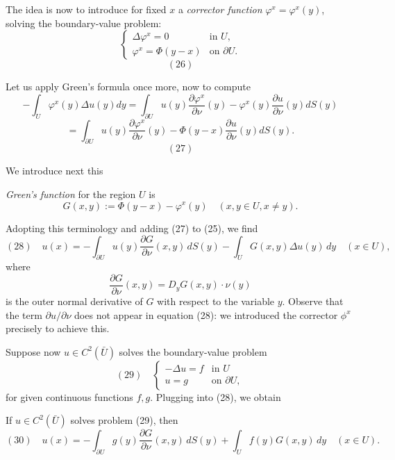 The idea is now to introduce for fixed $x$ a \textit{corrector function} $\varphi^x = \varphi^x(y)$, solving the boundary-value problem:
$$\begin{cases}
\Delta \varphi^x = 0 & \text{in } U, \\
\varphi^x = \Phi(y - x) & \text{on } \partial U.
\end{cases}$$
$$(26)$$

Let us apply Green's formula once more, now to compute
$$- \int_U \varphi^x(y) \Delta u(y) dy = \int_{\partial U} u(y) \frac{\partial \varphi^x}{\partial \nu}(y) - \varphi^x(y) \frac{\partial u}{\partial \nu}(y) dS(y)$$
$$= \int_{\partial U} u(y) \frac{\partial \varphi^x}{\partial \nu}(y) - \Phi(y - x) \frac{\partial u}{\partial \nu}(y) dS(y).$$
$$(27)$$

We introduce next this

\begin{definition}
\label{def:greens-function}
\textit{Green's function} for the region $U$ is
$$G(x, y) := \Phi(y - x) - \varphi^x(y) \quad (x, y \in U, x \neq y).$$
\end{definition}

Adopting this terminology and adding (27) to (25), we find
$$(28) \quad u(x) = -\int_{\partial U} u(y) \frac{\partial G}{\partial \nu}(x, y) \, dS(y) - \int_U G(x,y)\Delta u(y) \, dy \quad (x \in U),$$
where
$$\frac{\partial G}{\partial \nu}(x,y) = D_y G(x,y) \cdot \nu(y)$$
is the outer normal derivative of $G$ with respect to the variable $y$. Observe that the term $\partial u/\partial \nu$ does not appear in equation (28): we introduced the corrector $\phi^x$ precisely to achieve this.

Suppose now $u \in C^2(\bar{U})$ solves the boundary-value problem
$$(29) \quad \begin{cases}
-\Delta u = f & \text{in } U \\
u = g & \text{on } \partial U,
\end{cases}$$
for given continuous functions $f, g$. Plugging into (28), we obtain

\begin{theorem}
\label{thm:representation-formula-greens-function}
If $u \in C^2(\bar{U})$ solves problem (29), then
$$(30) \quad u(x) = -\int_{\partial U} g(y) \frac{\partial G}{\partial \nu}(x,y) \, dS(y) + \int_U f(y)G(x,y) \, dy \quad (x \in U).$$
\end{theorem}

